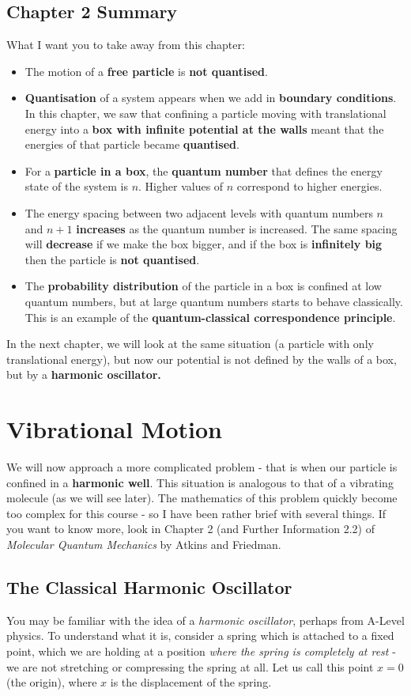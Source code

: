 \documentclass{memoir}[11pt,oneside,a4paper,openany]
\begin{document}
\section{Chapter 2 Summary}
What I want you to take away from this chapter:
\begin{itemize}
	\item The motion of a \textbf{free particle} is \textbf{not quantised}.
	\item \textbf{Quantisation} of a system appears when we add in \textbf{boundary conditions}. In this chapter, we saw that confining a particle moving with translational energy into a \textbf{box with infinite potential at the walls} meant that the energies of that particle became \textbf{quantised}.
	\item For a \textbf{particle in a box}, the \textbf{quantum number} that defines the energy state of the system is $n$. Higher values of $n$ correspond to higher energies.
	\item The energy spacing between two adjacent levels with quantum numbers $n$ and $n+1$ \textbf{increases} as the quantum number is increased. The same spacing will \textbf{decrease} if we make the box bigger, and if the box is \textbf{infinitely big} then the particle is \textbf{not quantised}.
	\item The \textbf{probability distribution} of the particle in a box is confined at low quantum numbers, but at large quantum numbers starts to behave classically. This is an example of the \textbf{quantum-classical correspondence principle}.
\end{itemize}
In the next chapter, we will look at the same situation (a particle with only translational energy), but now our potential is not defined by the walls of a box, but by a \textbf{harmonic oscillator.}

\chapter{Vibrational Motion}
We will now approach a more complicated problem - that is when our particle is confined in a \textbf{harmonic well}. This situation is analogous to that of a vibrating molecule (as we will see later). The mathematics of this problem quickly become too complex for this course - so I have been rather brief with several things. If you want to know more, look in Chapter 2 (and Further Information 2.2) of \emph{Molecular Quantum Mechanics} by Atkins and Friedman.

\section{The Classical Harmonic Oscillator}
You may be familiar with the idea of a \emph{harmonic oscillator}, perhaps from A-Level physics. To understand what it is, consider a spring which is attached to a fixed point, which we are holding at a position \emph{where the spring is completely at rest} - we are not stretching or compressing the spring at all. Let us call this point $x=0$ (the origin), where $x$ is the displacement of the spring. 
\end{document}
